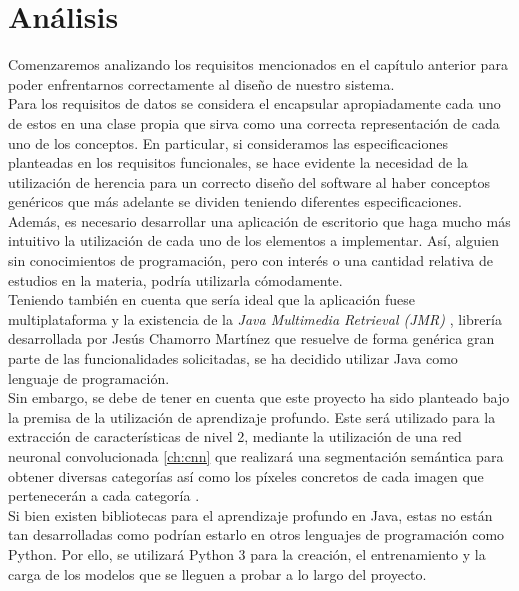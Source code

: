 \chapter{Análisis}
Comenzaremos analizando los requisitos mencionados en el capítulo anterior para poder enfrentarnos correctamente al diseño de nuestro sistema.\\

Para los requisitos de datos se considera el encapsular apropiadamente cada uno de estos en una clase propia que sirva como una correcta representación de cada uno de los conceptos. En particular, si consideramos las especificaciones planteadas en los requisitos funcionales, se hace evidente la necesidad de la utilización de herencia para un correcto diseño del software al haber conceptos genéricos que más adelante se dividen teniendo diferentes especificaciones.\\

Además, es necesario desarrollar una aplicación de escritorio que haga mucho más intuitivo la utilización de cada uno de los elementos a implementar. Así, alguien sin conocimientos de programación, pero con interés o una cantidad relativa de estudios en la materia, podría utilizarla cómodamente.\\

Teniendo también en cuenta que sería ideal que la aplicación fuese multiplataforma y la existencia de la \emph{Java Multimedia Retrieval (JMR)} \cite{JMR}, librería desarrollada por Jesús Chamorro Martínez que resuelve de forma genérica gran parte de las funcionalidades solicitadas, se ha decidido utilizar Java como lenguaje de programación.\\

Sin embargo, se debe de tener en cuenta que este proyecto ha sido planteado bajo la premisa de la utilización de aprendizaje profundo. Este será utilizado para la extracción de características de nivel 2, mediante la utilización de una red neuronal convolucionada \autoref{ch:cnn} que realizará una segmentación semántica para obtener diversas categorías así como los píxeles concretos de cada imagen que pertenecerán a cada categoría \cite{ch:fast-attention}.\\

Si bien existen bibliotecas para el aprendizaje profundo en Java, estas no están tan desarrolladas como podrían estarlo en otros lenguajes de programación como Python. Por ello, se utilizará Python 3 para la creación, el entrenamiento y la carga de los modelos que se lleguen a probar a lo largo del proyecto.\\

